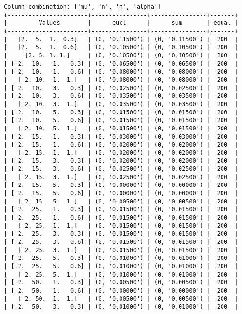 \documentclass{article}
\begin{document}
\begin{verbatim}
Column combination: ['mu', 'n', 'm', 'alpha']
+-----------------------+----------------+----------------+-------+
|         Values        |      eucl      |      sum       | equal |
+-----------------------+----------------+----------------+-------+
|   [2.  5.  1.  0.3]   | (0, '0.11500') | (0, '0.11500') |  200  |
|   [2.  5.  1.  0.6]   | (0, '0.10500') | (0, '0.10500') |  200  |
|     [2. 5. 1. 1.]     | (0, '0.10500') | (0, '0.10500') |  200  |
| [ 2.  10.   1.   0.3] | (0, '0.06500') | (0, '0.06500') |  200  |
| [ 2.  10.   1.   0.6] | (0, '0.08000') | (0, '0.08000') |  200  |
|   [ 2. 10.  1.  1.]   | (0, '0.08000') | (0, '0.08000') |  200  |
| [ 2.  10.   3.   0.3] | (0, '0.02500') | (0, '0.02500') |  200  |
| [ 2.  10.   3.   0.6] | (0, '0.03500') | (0, '0.03500') |  200  |
|   [ 2. 10.  3.  1.]   | (0, '0.03500') | (0, '0.03500') |  200  |
| [ 2.  10.   5.   0.3] | (0, '0.01500') | (0, '0.01500') |  200  |
| [ 2.  10.   5.   0.6] | (0, '0.01500') | (0, '0.01500') |  200  |
|   [ 2. 10.  5.  1.]   | (0, '0.01500') | (0, '0.01500') |  200  |
| [ 2.  15.   1.   0.3] | (0, '0.03000') | (0, '0.03000') |  200  |
| [ 2.  15.   1.   0.6] | (0, '0.02000') | (0, '0.02000') |  200  |
|   [ 2. 15.  1.  1.]   | (0, '0.02000') | (0, '0.02000') |  200  |
| [ 2.  15.   3.   0.3] | (0, '0.02000') | (0, '0.02000') |  200  |
| [ 2.  15.   3.   0.6] | (0, '0.02500') | (0, '0.02500') |  200  |
|   [ 2. 15.  3.  1.]   | (0, '0.02500') | (0, '0.02500') |  200  |
| [ 2.  15.   5.   0.3] | (0, '0.00000') | (0, '0.00000') |  200  |
| [ 2.  15.   5.   0.6] | (0, '0.00000') | (0, '0.00000') |  200  |
|   [ 2. 15.  5.  1.]   | (0, '0.00500') | (0, '0.00500') |  200  |
| [ 2.  25.   1.   0.3] | (0, '0.01500') | (0, '0.01500') |  200  |
| [ 2.  25.   1.   0.6] | (0, '0.01500') | (0, '0.01500') |  200  |
|   [ 2. 25.  1.  1.]   | (0, '0.01500') | (0, '0.01500') |  200  |
| [ 2.  25.   3.   0.3] | (0, '0.01500') | (0, '0.01500') |  200  |
| [ 2.  25.   3.   0.6] | (0, '0.01500') | (0, '0.01500') |  200  |
|   [ 2. 25.  3.  1.]   | (0, '0.01500') | (0, '0.01500') |  200  |
| [ 2.  25.   5.   0.3] | (0, '0.01000') | (0, '0.01000') |  200  |
| [ 2.  25.   5.   0.6] | (0, '0.01000') | (0, '0.01000') |  200  |
|   [ 2. 25.  5.  1.]   | (0, '0.01000') | (0, '0.01000') |  200  |
| [ 2.  50.   1.   0.3] | (0, '0.00500') | (0, '0.00500') |  200  |
| [ 2.  50.   1.   0.6] | (0, '0.00000') | (0, '0.00000') |  200  |
|   [ 2. 50.  1.  1.]   | (0, '0.00500') | (0, '0.00500') |  200  |
| [ 2.  50.   3.   0.3] | (0, '0.01000') | (0, '0.01000') |  200  |

\end{verbatim}
\end{document}
